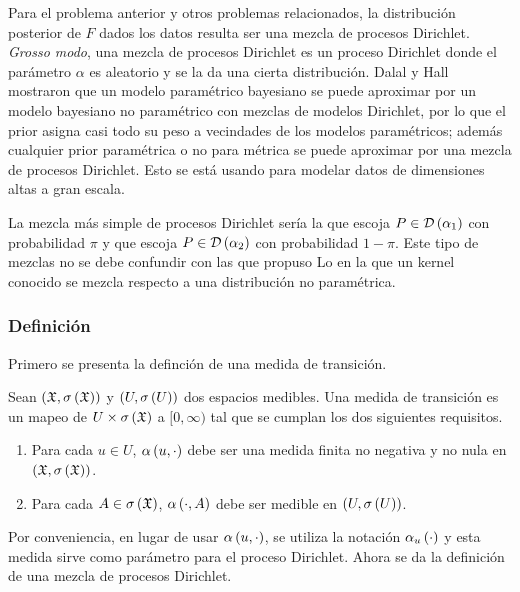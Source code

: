 Para el problema anterior y otros problemas relacionados, la distribución posterior de $F$ dados los datos resulta ser %
una mezcla de procesos Dirichlet. \textit{Grosso modo}, una mezcla de procesos Dirichlet es un proceso Dirichlet donde %
el parámetro $\alpha$ es aleatorio y se la da una cierta distribución. Dalal y Hall mostraron que un modelo paramétrico %
bayesiano se puede aproximar por un modelo bayesiano no paramétrico con mezclas de modelos Dirichlet, por lo que el %
prior asigna casi todo su peso a vecindades de los modelos paramétricos; además cualquier prior paramétrica o no para%
métrica se puede aproximar por una mezcla de procesos Dirichlet. Esto se está usando para modelar datos de dimensiones %
altas a gran escala.

La mezcla más simple de procesos Dirichlet sería la que escoja $P \in \mathcal{D}\left( \alpha_{1} \right)$ con probabilidad $\pi$ y que %
escoja $P \in \mathcal{D}\left( \alpha_{2} \right)$ con probabilidad $1 - \pi$. Este tipo de mezclas no se debe confundir con las que %
propuso Lo en la que un kernel conocido se mezcla respecto a una distribución no paramétrica. 


\subsubsection{Definición}

Primero se presenta la definción de una medida de transición.

\begin{defi}[Antoniak]
Sean $\left( \mathfrak{X}, \sigma\left( \mathfrak{X} \right) \right)$ y $\left( U, \sigma\left( U \right) \right)$ dos espacios medibles. Una medida de transición es un mapeo %
de $U \times \sigma\left( \mathfrak{X} \right)$ a $[0, \infty)$ tal que se cumplan los dos siguientes requisitos.
\begin{enumerate}
    \item Para cada $u \in U$, $\alpha\left( u, \cdot \right)$ debe ser una medida finita no negativa y no nula en $\Pp{\X, %
    \sigma\Pp{\X}}$.
    \item Para cada $A \in \sigma\left( \mathfrak{X} \right)$, $\alpha\left( \cdot, A \right)$ debe ser medible en $\left( U, \sigma\left( U \right) \right)$. 
\end{enumerate}
\end{defi}

Por conveniencia, en lugar de usar $\alpha\left( u, \cdot \right)$, se utiliza la notación $\alpha_{u}\left( \cdot \right)$ y esta medida %
sirve como parámetro para el proceso Dirichlet. Ahora se da la definición de una mezcla de procesos Dirichlet.

